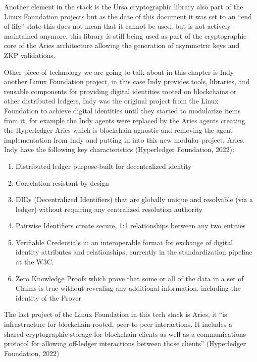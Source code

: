 Another element in the stack is the Ursa cryptographic library also part of the Linux Foundation projects but as the date of this document it was set to an “end of life” state this does not mean that it cannot be used, but is not actively maintained anymore, this library is still being used as part of the cryptographic core of the Aries architecture allowing the generation of asymmetric keys and ZKP validations.

Other piece of technology we are going to talk about in this chapter is Indy another Linux Foundation project, in this case Indy provides tools, libraries, and reusable components for providing digital identities rooted on blockchains or other distributed ledgers, Indy was the original project from the Linux Foundation to achieve digital identities until they started to modularize items from it, for example the Indy agents were replaced by the Aries agents creating the Hyperledger Aries which is blockchain-agnostic and removing the agent implementation from Indy and putting in into this new modular project, Aries. Indy have the following key characteristics (Hyperledger Foundation, 2022):

\begin{enumerate}
    \item Distributed ledger purpose-built for decentralized identity
    \item Correlation-resistant by design
    \item DIDs (Decentralized Identifiers) that are globally unique and resolvable (via a ledger) without requiring any centralized resolution authority
    \item Pairwise Identifiers create secure, 1:1 relationships between any two entities
    \item Verifiable Credentials in an interoperable format for exchange of digital identity attributes and relationships, currently in the standardization pipeline at the W3C.
    \item Zero Knowledge Proofs which prove that some or all of the data in a set of Claims is true without revealing any additional information, including the identity of the Prover
\end{enumerate}

The last project of the Linux Foundation in this tech stack is Aries, it “is infrastructure for blockchain-rooted, peer-to-peer interactions. It includes a shared cryptographic storage for blockchain clients as well 
as a communications protocol for allowing off-ledger interactions between those clients” (Hyperledger 
Foundation, 2022)

